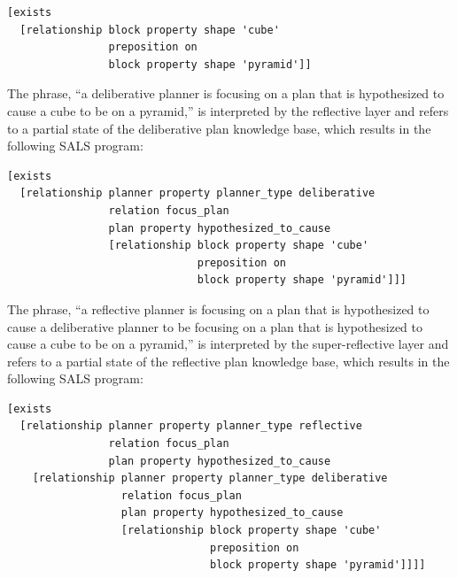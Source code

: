 \begin{samepage}
\begin{Verbatim}
[exists
  [relationship block property shape 'cube'
                preposition on
                block property shape 'pyramid']]
\end{Verbatim}
\end{samepage}

\noindent The phrase, ``a deliberative planner is focusing on a plan
that is hypothesized to cause a cube to be on a pyramid,'' is
interpreted by the reflective layer and refers to a partial state of
the deliberative plan knowledge base, which results in the following
SALS program:

\begin{samepage}
\begin{Verbatim}
[exists
  [relationship planner property planner_type deliberative
                relation focus_plan
                plan property hypothesized_to_cause
                [relationship block property shape 'cube'
                              preposition on
                              block property shape 'pyramid']]]
\end{Verbatim}
\end{samepage}

\noindent The phrase, ``a reflective planner is focusing on a plan
that is hypothesized to cause a deliberative planner to be focusing on
a plan that is hypothesized to cause a cube to be on a pyramid,'' is
interpreted by the super-reflective layer and refers to a partial
state of the reflective plan knowledge base, which results in the
following SALS program:

\begin{samepage}
\begin{Verbatim}
[exists 
  [relationship planner property planner_type reflective
                relation focus_plan
                plan property hypothesized_to_cause
    [relationship planner property planner_type deliberative
                  relation focus_plan
                  plan property hypothesized_to_cause
                  [relationship block property shape 'cube'
                                preposition on
                                block property shape 'pyramid']]]]
\end{Verbatim}
\end{samepage}



